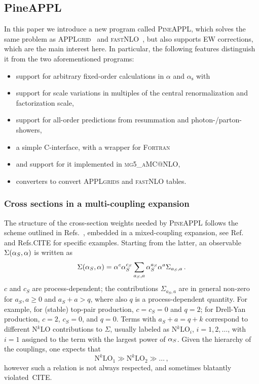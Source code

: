 \subsection{PineAPPL}
\label{sec:pineappl}

In this paper we introduce a new program called \textsc{PineAPPL}, which solves the same problem as \textsc{APPLgrid}~\cite{} and \textsc{fastNLO}~\cite{}, but also supports EW corrections, which are the main interest here.
In particular, the following features distinguish it from the two aforementioned programs:
\begin{itemize}
\item support for arbitrary fixed-order calculations in $\alpha$ and $\alpha_\mathrm{s}$ with
\item support for scale variations in multiples of the central renormalization and factorization scale,
\item support for all-order predictions from resummation and photon-/parton-showers,
\item a simple \textsc{C}-interface, with a wrapper for \textsc{Fortran}
\item and support for it implemented in \textsc{mg5\_aMC@NLO},
\item converters to convert \textsc{APPLgrids} and \textsc{fastNLO} tables.
\end{itemize}

\subsubsection{Cross sections in a multi-coupling expansion}
The structure of the cross-section weights needed by \textsc{PineAPPL} follows the scheme outlined in 
Refs.~\cite{Frederix:2011ss, Bertone:2014zva}, embedded in a mixed-coupling expansion, see Ref.~\cite{Frederix:2018nkq} and Refs.CITE for
specific examples. Starting 
from the latter, an observable $\Sigma(\alpha_{S}, \alpha)$ is written as
\begin{equation}
    \Sigma(\alpha_{S}, \alpha) = \alpha^c \alpha_{S}^{c_S} \sum_{a_S, a} \alpha_{S}^{a_S} \alpha^a \Sigma_{a_S, a}\,.
\end{equation}
$c$ and $c_S$ are process-dependent; the contributions $\Sigma_{a_S, a}$ are in general non-zero for $a_S, a \ge 0$ and $a_S + a > q$, where also $q$ is a process-dependent quantity. For example,
for (stable) top-pair production, $c=c_S=0$ and $q=2$; for Drell-Yan production, $c=2$, $c_S=0$, and $q=0$. Terms 
with  $a_S + a = q + k$ correspond to different N$^k$LO contributions to $\Sigma$, usually
labeled as N$^k$LO$_i$, $i =1,2, \ldots$, with $i=1$ assigned to the term with the largest power of $\alpha_{S}$. Given the hierarchy of the couplings,
one expects that 
\begin{equation}
 \textrm{N}^k\textrm{LO}_1 \gg \textrm{N}^k\textrm{LO}_2 \gg\ldots \, ,
\end{equation}
however such a relation is not always respected, and sometimes blatantly violated~CITE.

